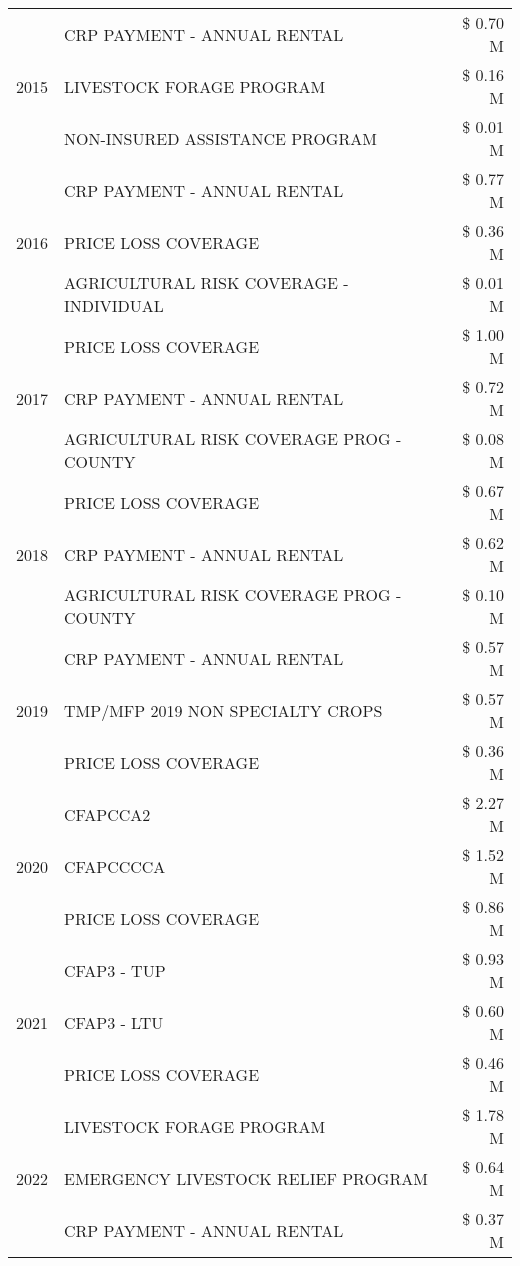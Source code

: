 \begin{tabular}{llr}
\cline{1-3}
\multirow[t]{3}{*}{2015} & CRP PAYMENT - ANNUAL RENTAL & \$ 0.70 M \\
 & LIVESTOCK FORAGE PROGRAM & \$ 0.16 M \\
 & NON-INSURED ASSISTANCE PROGRAM & \$ 0.01 M \\
\cline{1-3}
\multirow[t]{3}{*}{2016} & CRP PAYMENT - ANNUAL RENTAL & \$ 0.77 M \\
 & PRICE LOSS COVERAGE & \$ 0.36 M \\
 & AGRICULTURAL RISK COVERAGE - INDIVIDUAL & \$ 0.01 M \\
\cline{1-3}
\multirow[t]{3}{*}{2017} & PRICE LOSS COVERAGE & \$ 1.00 M \\
 & CRP PAYMENT - ANNUAL RENTAL & \$ 0.72 M \\
 & AGRICULTURAL RISK COVERAGE PROG - COUNTY & \$ 0.08 M \\
\cline{1-3}
\multirow[t]{3}{*}{2018} & PRICE LOSS COVERAGE & \$ 0.67 M \\
 & CRP PAYMENT - ANNUAL RENTAL & \$ 0.62 M \\
 & AGRICULTURAL RISK COVERAGE PROG - COUNTY & \$ 0.10 M \\
\cline{1-3}
\multirow[t]{3}{*}{2019} & CRP PAYMENT - ANNUAL RENTAL & \$ 0.57 M \\
 & TMP/MFP 2019 NON SPECIALTY CROPS & \$ 0.57 M \\
 & PRICE LOSS COVERAGE & \$ 0.36 M \\
\cline{1-3}
\multirow[t]{3}{*}{2020} & CFAPCCA2 & \$ 2.27 M \\
 & CFAPCCCCA & \$ 1.52 M \\
 & PRICE LOSS COVERAGE & \$ 0.86 M \\
\cline{1-3}
\multirow[t]{3}{*}{2021} & CFAP3 - TUP & \$ 0.93 M \\
 & CFAP3 - LTU & \$ 0.60 M \\
 & PRICE LOSS COVERAGE & \$ 0.46 M \\
\cline{1-3}
\multirow[t]{3}{*}{2022} & LIVESTOCK FORAGE PROGRAM & \$ 1.78 M \\
 & EMERGENCY LIVESTOCK RELIEF PROGRAM & \$ 0.64 M \\
 & CRP PAYMENT - ANNUAL RENTAL & \$ 0.37 M \\
\cline{1-3}
\bottomrule
\end{tabular}
